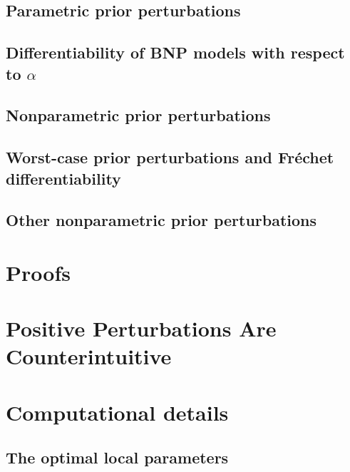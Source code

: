 \documentclass[ba]{imsart}
\begin{document}
    \subsection{Parametric prior perturbations}
    

    \subsection{Differentiability of BNP models with respect to $\alpha$}
    

    \subsection{Nonparametric prior perturbations}
    

    \subsection{Worst-case prior perturbations and Fr{\'e}chet differentiability}
    

    \subsection{Other nonparametric prior perturbations}
    

\section{Proofs}


\section{Positive Perturbations Are Counterintuitive}


\section{Computational details}

\subsection{The optimal local parameters}

\end{document}
